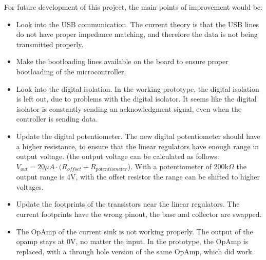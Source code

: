 \IEEEPARstart
{F}{or} future development of this project, the main points of improvement would be:
\begin{itemize}
      \item Look into the USB communication. The current theory is that the USB lines do not have proper impedance matching, and therefore the data is not being transmitted properly.
      \item Make the bootloading lines available on the board to ensure proper bootloading of the microcontroller.
      \item Look into the digital isolation. In the working prototype, the digital isolation is left out, due to problems with the digital isolator. It seems like the digital isolator is constantly sending an acknowledgment signal, even when the controller is sending data.
      \item Update the digital potentiometer. The new digital potentiometer should have a higher resistance, to ensure that the linear regulators have enough range in output voltage. (the output voltage can be calculated as follows: $V_{out} = 20\mu A \cdot (R_{offset}+R_{potentiometer}$). With a potentiometer of 200k$\Omega$ the output range is 4V, with the offset resistor the range can be shifted to higher voltages.
      \item Update the footprints of the transistors near the linear regulators. The current footprints have the wrong pinout, the base and collector are swapped.
      \item The OpAmp of the current sink is not working properly. The output of the opamp stays at 0V, no matter the input. In the prototype, the OpAmp is replaced, with a through hole version of the same OpAmp, which did work. 
\end{itemize}  